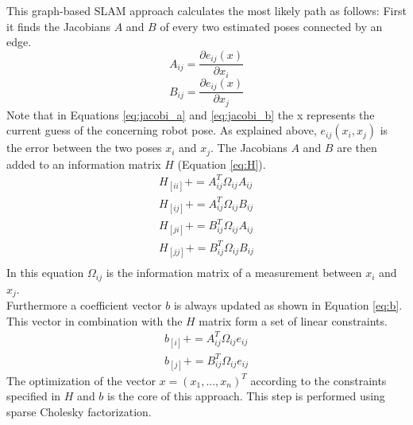 \documentclass{ba-kecs}
\begin{document}
This graph-based SLAM approach calculates the most likely path as follows:
First it finds the Jacobians \(A\) and \(B\) of every two estimated poses connected by an edge.
\begin{equation}
\label{eq:jacobi_a}
	A_{ij} = \frac{\partial e_{ij}(x)}{\partial x_i}
\end{equation}
\begin{equation}
\label{eq:jacobi_b}
	B_{ij} = \frac{\partial e_{ij}(x)}{\partial x_j}
\end{equation}
Note that in Equations \ref{eq:jacobi_a} and \ref{eq:jacobi_b} the x represents the current guess of the concerning robot pose. As explained above, \(e_{ij}(x_i, x_j)\) is the error between the two poses \(x_i\) and \(x_j\). The Jacobians \(A\) and \(B\) are then added to an information matrix \(H\) (Equation \ref{eq:H}).
\begin{equation}
\label{eq:H}
\begin{aligned}
	H_{[ii]} += A^{T}_{ij} \Omega_{ij} A_{ij} \\
	H_{[ij]} += A^{T}_{ij} \Omega_{ij} B_{ij} \\
	H_{[ji]} += B^{T}_{ij} \Omega_{ij} A_{ij} \\
	H_{[jj]} += B^{T}_{ij} \Omega_{ij} B_{ij} \\
\end{aligned}
\end{equation}
In this equation $\Omega_{ij}$ is the information matrix of a measurement between \(x_i\) and \(x_j\).
\\
Furthermore a coefficient vector \(b\) is always updated as shown in Equation \ref{eq:b}. This vector in combination with the \(H\) matrix form a set of linear constraints.
\begin{equation}
\label{eq:b}
\begin{aligned}
	b_{[i]} += A^{T}_{ij} \Omega_{ij} e_{ij} \\
	b_{[j]} += B^{T}_{ij} \Omega_{ij} e_{ij} 
\end{aligned}
\end{equation}
The optimization of the vector \(x = (x_1, ..., x_n)^T \) according to the constraints specified in \(H\) and \(b\) is the core of this approach. This step is performed using sparse Cholesky factorization. 
\end{document}
